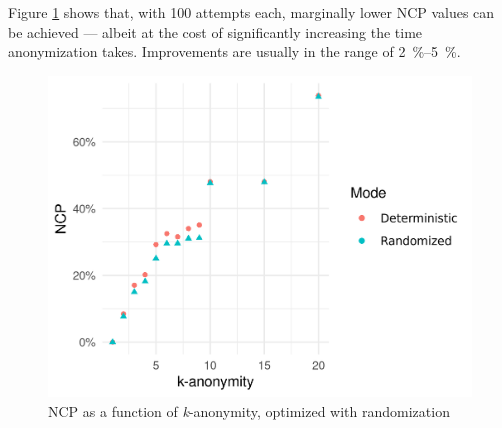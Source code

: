 \documentclass[a4paper]{scrreprt}
\begin{document}
Figure \ref{fig:k_anonymity_ncp_randomized} shows that, with 100 attempts each,
marginally lower NCP values can be achieved --- albeit at the cost of
significantly increasing the time anonymization takes. Improvements are usually
in the range of \SIrange{2}{5}{\percent}.

\begin{figure}
		\centering
		\includegraphics[width=\textwidth]{resources/k_anonymity_ncp_randomized.png}
		\caption{NCP as a function of \emph{k}-anonymity, optimized with randomization}
		\label{fig:k_anonymity_ncp_randomized}
\end{figure}

\printbibliography
\end{document}
